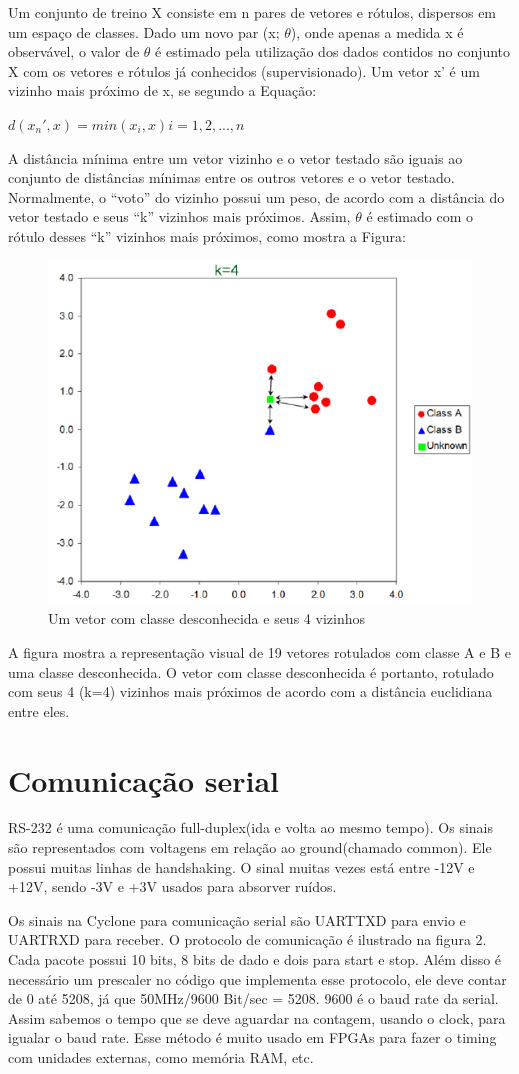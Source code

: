 \documentclass[12pt]{article}
\begin{document}
Um conjunto de treino X consiste em n pares de vetores e rótulos, dispersos em
um espaço de classes. Dado um novo par (x; $\theta$), onde apenas a medida x é
observável, o valor de $\theta$	é estimado pela utilização dos dados contidos no
conjunto X com os vetores e rótulos já conhecidos (supervisionado). Um vetor x'
é um vizinho mais próximo de x, se segundo a Equação:

$d(x_{n}', x) = min(x_i, x) i = 1, 2, ...,n$

A distância mínima entre um vetor vizinho e o vetor testado são iguais ao 
conjunto de distâncias mínimas entre os outros vetores e o vetor testado.
Normalmente, o ``voto'' do vizinho possui um peso, de acordo com a distância do 
vetor testado e seus ``k'' vizinhos mais próximos. Assim, $\theta$ é estimado 
com o rótulo desses ``k'' vizinhos mais próximos, como mostra a Figura:

\begin{figure}[ht]
	\centering
	\includegraphics[width=.5\textwidth]{img/knn.png}
	\caption{Um vetor com classe desconhecida e seus 4 vizinhos}
	\label{fig:fig1}
\end{figure}

A figura mostra a representação visual de 19 vetores rotulados com classe A e B
e uma classe desconhecida. O vetor com classe desconhecida é portanto, rotulado
com seus 4 (k=4) vizinhos mais próximos de acordo com a distância euclidiana 
entre eles.

\section{Comunicação serial}

RS-232 é uma comunicação full-duplex(ida e volta ao mesmo tempo). Os sinais são representados com voltagens em relação ao
ground(chamado common). Ele possui muitas linhas de handshaking. O sinal muitas vezes está entre -12V e +12V, sendo -3V e
+3V usados para absorver ruídos.

Os sinais na Cyclone para comunicação serial são UART\underline{\hspace{.1in}}TXD para envio e 
UART\underline{\hspace{.1in}}RXD para receber. O protocolo de comunicação é ilustrado na figura 2. Cada pacote possui 10
bits, 8 bits de dado e dois para start e stop. Além disso é necessário um prescaler no código que implementa esse 
protocolo, ele deve contar de 0 até 5208, já que 50MHz/9600 Bit/sec = 5208. 9600 é o baud rate da serial. Assim sabemos o 
tempo que se deve aguardar na contagem, usando o clock, para igualar o baud rate. Esse método é muito usado em FPGAs para 
fazer o timing com unidades externas, como memória RAM, etc.
\end{document}
